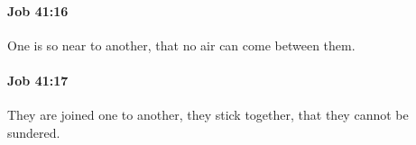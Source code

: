 		\paragraph{Job 41:16} %
			\label{JOB-41-16}

			One is so near to another, that no air can come between them.


		\paragraph{Job 41:17} %
			\label{JOB-41-17}

			They are joined one to another, they stick together, that they cannot be sundered.


